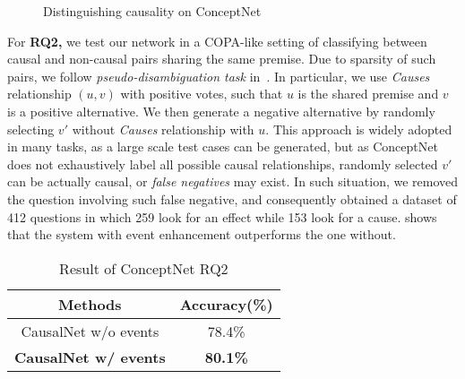 \begin{figure}[htb]
\centering
{}
\caption{Distinguishing causality on ConceptNet}
\label{fig:conceptApp1}
\end{figure}

For {\bf RQ2,} we test our network in a COPA-like setting
of classifying between causal and non-causal pairs sharing the
same premise. Due to sparsity of such pairs,
we follow \emph{pseudo-disambiguation task} in~\cite{Erk}.
In particular, we use \emph{Causes} relationship $(u,v)$ with
positive votes, such that $u$ is the shared premise and $v$ is a
positive alternative. We then generate a negative alternative by
randomly selecting $v'$ without \emph{Causes} relationship with $u$.
This approach is widely adopted in many tasks, as a large scale test
cases can be generated, but as ConceptNet does not exhaustively
label all possible causal relationships, randomly selected $v'$ can
be actually causal, or \emph{false negatives} may exist. In such
situation, we removed the question involving such false negative,
and consequently obtained a dataset of 412 questions in which 259
look for an effect while 153 look for a cause. 
shows that the system with event enhancement outperforms the one
without.

\begin{table}[th]
\centering
\caption{Result of ConceptNet RQ2}
\begin{tabular}{cc}
\hline
Methods & Accuracy(\%) \\
\hline
CausalNet w/o events & 78.4\%  \\
{\bf CausalNet w/ events} & {\bf 80.1\% }  \\
\hline
\end{tabular}
\label{tab:rq2}
\end{table}

